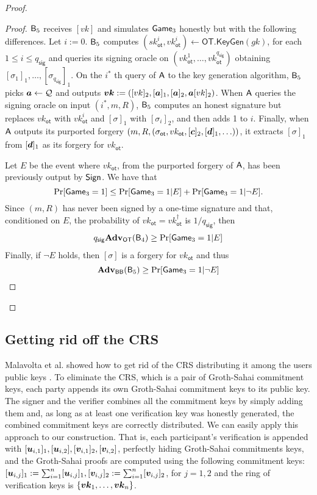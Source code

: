 \begin{proof}
\begin{proof}
$\mathsf{B}_5$ receives $[vk]$ and simulates $\mathsf{Game}_3$ honestly but with the following differences. Let $i:=0$. $\mathsf{B}_5$ computes $(sk_\mathsf{ot}^i,vk_\mathsf{ot}^i)\gets\mathsf{OT}.\mathsf{KeyGen}(gk)$, for each $1\leq i\leq q_\mathsf{sig}$ and queries its signing oracle on $(vk_{\mathsf{ot}}^1,\ldots,vk_\mathsf{ot}^{q_{\mathsf{sig}}})$ obtaining $[\sigma_1]_1,\ldots,[\sigma_{q_\mathsf{sig}}]_1$. On the $i^*$ th query of $\mathsf{A}$ to the key generation algorithm, $\mathsf{B}_5$ picks ${\boldsymbol{a}}\gets\mathcal{Q}$ and outputs ${\boldsymbol{vk}}:=([vk]_2,[{\boldsymbol{a}}]_1,[{\boldsymbol{a}}]_2,{\boldsymbol{a}}[vk]_2)$. When $\mathsf{A}$ queries the signing oracle on input $(i^*,m,R)$, $\mathsf{B}_5$ computes an honest signature but replaces $vk_\mathsf{ot}$ with $vk_\mathsf{ot}^i$ and $[\sigma]_1$ with $[\sigma_i]_2$, and then adds 1 to $i$. Finally, when $\mathsf{A}$ outputs its purported forgery $(m,R,(\sigma_\mathsf{ot},vk_\mathsf{ot},[{\boldsymbol{c}}]_2,[{\boldsymbol{d}}]_1,\ldots))$, it extracts $[\sigma]_1$ from $[{\boldsymbol{d}}]_1$ as its forgery for $vk_\mathsf{ot}$.

Let $E$ be the event where $vk_\mathsf{ot}$, from the purported forgery of $\mathsf{A}$, has been previously output by $\mathsf{Sign}$. We have that
$$
\Pr[\mathsf{Game}_3=1]\leq \Pr[\mathsf{Game}_3=1|E]+\Pr[\mathsf{Game}_3=1|\neg E].
$$
Since  $(m,R)$ has never been signed by a one-time signature and that, conditioned on $E$, the probability of $vk_\mathsf{ot}=vk_\mathsf{ot}^\dag$ is $1/q_\mathsf{sig}$, then
\begin{align*}
q_{\mathsf{sig}}\mathbf{Adv}_\mathsf{OT}(\mathsf{B}_4)\geq  \Pr[\mathsf{Game}_3=1|E]
\end{align*}
Finally, if $\neg E$ holds, then $[\sigma]$ is a forgery for $vk_\mathsf{ot}$ and thus
$$
\mathbf{Adv}_{\mathsf{BB}}(\mathsf{B}_5)\geq \Pr[\mathsf{Game}_3=1|\neg E]$$
\end{proof}
\end{proof}

\subsection{Getting rid off the CRS}
Malavolta et al. showed how to get rid of the CRS distributing it among the users public keys \cite{AC:MalSch17}. To eliminate the CRS, which is a pair of Groth-Sahai commitment keys, each party appends its own Groth-Sahai commitment keys to its public key. The signer and the verifier combines all the commitment keys by simply adding them and, as long as at least one verification key was honestly generated, the combined commitment keys are correctly distributed. We can easily apply this approach to our construction. That is, each participant's verification is appended with $[{\boldsymbol{u}}_{i,1}]_1,[{\boldsymbol{u}}_{i,2}],[{\boldsymbol{v}}_{i,1}]_2,[{\boldsymbol{v}}_{i,2}]$, perfectly hiding Groth-Sahai commitments keys, and the Groth-Sahai proofs are computed using the following commitment keys: $[{\boldsymbol{u}}_{i,j}]_1 :=\sum_{i=1}^n [{\boldsymbol{u}}_{i,j}]_1,[{\boldsymbol{v}}_{i,j}]_2 :=\sum_{i=1}^n [{\boldsymbol{v}}_{i,j}]_2$, for $j=1,2$ and the ring of verification keys is $\{{\boldsymbol{vk}}_1,\ldots,{\boldsymbol{vk}}_n\}$.

